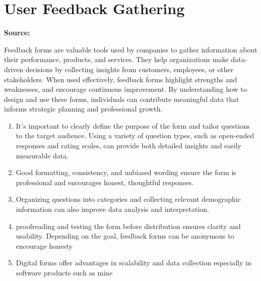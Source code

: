 \section{User Feedback Gathering}
\label{research:UserFeedbackGathering}
\textbf{Source:} \cite{HowWriteFeedback}

Feedback forms are valuable tools used by companies to gather information about their performance, products, and services. They help organizations make data-driven decisions by collecting insights from customers, employees, or other stakeholders. When used effectively, feedback forms highlight strengths and weaknesses, and encourage continuous improvement. By understanding how to design and use these forms, individuals can contribute meaningful data that informs strategic planning and professional growth.

\begin{enumerate}
    \item It’s important to clearly define the purpose of the form and tailor questions to the target audience. Using a variety of question types, such as open-ended responses and rating scales, can provide both detailed insights and easily measurable data. 
    \item Good formatting, consistency, and unbiased wording ensure the form is professional and encourages honest, thoughtful responses. 
    \item Organizing questions into categories and collecting relevant demographic information can also improve data analysis and interpretation.
    \item proofreading and testing the form before distribution ensures clarity and usability. Depending on the goal, feedback forms can be anonymous to encourage honesty
    \item Digital forms offer advantages in scalability and data collection especially in software products such as mine
\end{enumerate}

